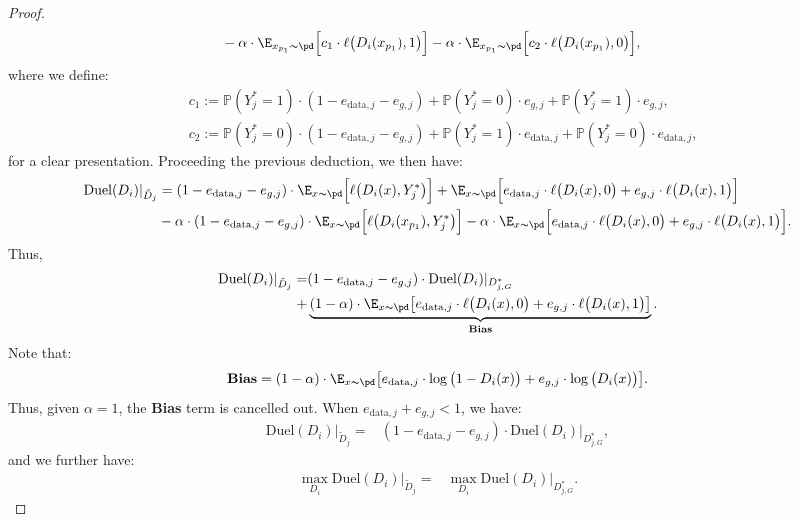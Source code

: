 \begin{proof}
{\begin{align}
      &-\alpha \cdot \E_{x_{p_1}\thicksim \pd}\Big[c_1\cdot \ell\big(D_{i}(x_{p_1}),1\big)\Big]\notag-\alpha \cdot \E_{x_{p_1}\thicksim \pd}\Big[c_2\cdot \ell\big(D_{i}(x_{p_1}),0\big)\Big],
\end{align}}
where we define: 
\begin{align*}
  &c_1:=\mathbb{P}(Y^*_j=1)\cdot (1-e_{\text{data},j}-e_{g,j})+\mathbb{P}(Y^*_j=0)\cdot e_{g,j}+\mathbb{P}(Y^*_j=1)\cdot e_{g,j},\\
  &c_2:=\mathbb{P}(Y^*_j=0)\cdot (1-e_{\text{data},j}-e_{g,j})+\mathbb{P}(Y^*_j=1)\cdot e_{\text{data},j}+\mathbb{P}(Y^*_j=0)\cdot e_{\text{data},j},
\end{align*}
for a clear presentation. Proceeding the previous deduction, we then have:
\begin{align}
    \text{Duel}(D_i)|_{\tilde{D}_{j}}&=(1-e_{\text{data}, j}-e_{g, j})\cdot\E_{x\thicksim \pd}\Big[ \ell\big(D_{i}(x),Y^*_j\big)\Big]+\E_{x\thicksim \pd}\Big[e_{\text{data}, j}\cdot \ell\big(D_{i}(x),0\big)+e_{g, j}\cdot \ell\big(D_{i}(x),1\big)\Big]\notag
    \\
    &-\alpha \cdot (1-e_{\text{data},j}-e_{g,j})\cdot  \E_{x\thicksim \pd}\Big[ \ell\big(D_{i}(x_{p_1}),Y^*_j\big)\Big]-\alpha \cdot \E_{x\thicksim \pd}\Big[e_{\text{data}, j}\cdot \ell\big(D_{i}(x),0\big)+e_{g, j}\cdot \ell\big(D_{i}(x),1\big)\Big].
\end{align}
Thus, 
\begin{align}
    \text{Duel}(D_i)|_{\tilde{D}_{j}}=&(1-e_{\text{data}, j}-e_{g, j})\cdot \text{Duel}(D_i)|_{D^*_{j,G}}\notag\\
    +&\underbrace{(1-\alpha)\cdot \E_{x\thicksim \pd} \big[e_{\text{data}, j}\cdot \ell\big(D_{i}(x),0\big)+e_{g, j}\cdot \ell\big(D_{i}(x),1\big)\big]}_{\textbf{Bias}}.
\end{align}
Note that:
\begin{align}
    \textbf{Bias}=(1-\alpha)\cdot \E_{x\thicksim \pd} \big[e_{\text{data}, j}\cdot \log\big(1-D_{i}(x)\big)+e_{g, j}\cdot \log\big(D_{i}(x)\big)\big].
\end{align}
Thus, given $\alpha=1$, the \textbf{Bias} term is cancelled out. When $e_{\text{data}, j}+e_{g, j}<1$, we have:
\begin{align}
    \text{Duel}(D_i)|_{\tilde{D}_{j}}=&(1-e_{\text{data}, j}-e_{g, j})\cdot \text{Duel}(D_i)|_{D^*_{j,G}},
\end{align}
and we further have:
\begin{align}
    \max_{D_{i}} \text{Duel}(D_i)|_{\tilde{D}_{j}}
    =& \max_{D_{i}} \text{Duel}(D_i)|_{D^*_{j,G}}.
\end{align}

\end{proof}

